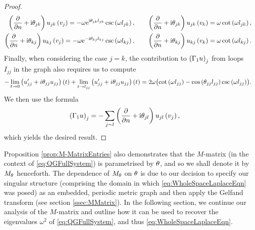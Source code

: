 \begin{proof}
\begin{align*}
		\left( \dfrac{\partial }{\partial n}+\mathrm{i}\theta_{jk} \right)u_{jk}\left( v_j \right) = -\omega \mathrm{e}^{\mathrm{i}\theta_{jk}l_{jk}}\csc\left( \omega l_{jk} \right), 
		&\qquad \left( \dfrac{\partial }{\partial n}+\mathrm{i}\theta_{jk} \right)u_{jk}\left( v_k \right) = \omega\cot\left( \omega l_{jk} \right), \\
		\left( \dfrac{\partial }{\partial n}+\mathrm{i}\theta_{kj} \right)u_{kj}\left( v_j \right) = -\omega \mathrm{e}^{-\mathrm{i}\theta_{kj}l_{kj}}\csc\left( \omega l_{kj} \right), 
		&\qquad \left( \dfrac{\partial }{\partial n}+\mathrm{i}\theta_{kj} \right)u_{kj}\left( v_k \right) = \omega\cot\left( \omega l_{kj} \right).
	\end{align*}
	Finally, when considering the case $j=k$, the contribution to $\left( \Gamma_1 u \right)_j$ from loops $I_{jj}$ in the graph also requires us to compute
	\begin{align*}
		-\lim_{t\rightarrow0}\left( u_{jj}'+i\theta_{jj}u_{jj} \right)(t) + \lim_{t\rightarrow l_{jj}}\left( u_{jj}'+i\theta_{jj}u_{jj} \right)(t)
		= 2\omega\bigl( \cot\left( \omega l_{jj} \right) - \cos\left( \theta_{jj}l_{jj} \right)\csc\left( \omega l_{jj} \right) \bigr).	
	\end{align*}
	We then use the formula
	\begin{align*}
		\left( \Gamma_1 u \right)_j &= -\sum_{j\sim l} \left( \dfrac{\partial }{\partial n}+\mathrm{i}\theta_{jl} \right)u_{jl}\left( v_j \right),
	\end{align*}
	which yields the desired result.
\end{proof}

Proposition \ref{prop:M-MatrixEntries} also demonstrates that the $M$-matrix (in the context of \eqref{eq:QGFullSystem}) is parametrised by $\theta$, and so we shall denote it by $M_{\theta}$ henceforth.
The dependence of $M_\theta$ on $\theta$ is due to our decision to specify our singular structure (comprising the domain in which \eqref{eq:WholeSpaceLaplaceEqn} was posed) as an embedded, periodic metric graph and then apply the Gelfand transform (see section \ref{ssec:MMatrix}).
In the following section, we continue our analysis of the $M$-matrix and outline how it can be used to recover the eigenvalues $\omega^2$ of \eqref{eq:QGFullSystem}, and thus \eqref{eq:WholeSpaceLaplaceEqn}.

